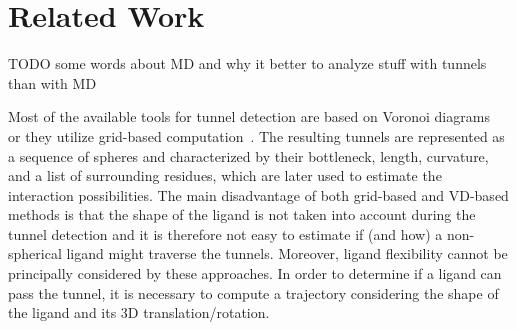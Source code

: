 \documentclass[usletter, 10pt, conference]{ieeeconf} %
\def\C{\mathcal{C}}
\begin{document}

\section{Related Work}


TODO some words about MD and why it better to analyze stuff with tunnels than with MD

Most of the available tools for tunnel detection are based on Voronoi diagrams~\cite{yaffe2008,caver3} or they utilize grid-based computation~\cite{sehnal2013mole}.
The resulting tunnels are represented as a sequence of spheres and characterized by their bottleneck, length, curvature, and a list of surrounding residues, which are later used to estimate the interaction possibilities.
The main disadvantage of both grid-based and VD-based methods is that the shape of the ligand is not taken into account during the tunnel detection and it is therefore not easy to estimate if (and how) a non-spherical ligand might traverse the tunnels.
Moreover, ligand flexibility cannot be principally considered by these approaches.
In order to determine if a ligand can pass the tunnel, it is necessary to compute a trajectory considering the shape of the ligand and its 3D translation/rotation.
\end{document}
